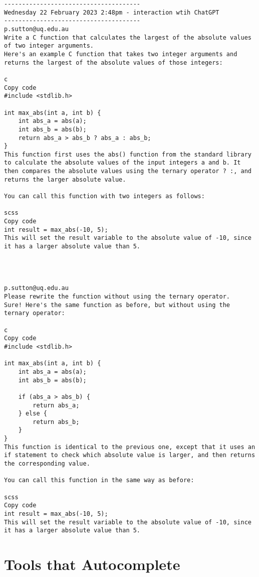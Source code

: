 \documentclass{article}
\begin{document}
\nolinenumbers
{}
\begin{lstlisting}
--------------------------------------
Wednesday 22 February 2023 2:48pm - interaction wtih ChatGPT
--------------------------------------
p.sutton@uq.edu.au
Write a C function that calculates the largest of the absolute values of two integer arguments.
Here's an example C function that takes two integer arguments and returns the largest of the absolute values of those integers:

c
Copy code
#include <stdlib.h>

int max_abs(int a, int b) {
    int abs_a = abs(a);
    int abs_b = abs(b);
    return abs_a > abs_b ? abs_a : abs_b;
}
This function first uses the abs() function from the standard library to calculate the absolute values of the input integers a and b. It then compares the absolute values using the ternary operator ? :, and returns the larger absolute value.

You can call this function with two integers as follows:

scss
Copy code
int result = max_abs(-10, 5);
This will set the result variable to the absolute value of -10, since it has a larger absolute value than 5.




p.sutton@uq.edu.au
Please rewrite the function without using the ternary operator.
Sure! Here's the same function as before, but without using the ternary operator:

c
Copy code
#include <stdlib.h>

int max_abs(int a, int b) {
    int abs_a = abs(a);
    int abs_b = abs(b);
    
    if (abs_a > abs_b) {
        return abs_a;
    } else {
        return abs_b;
    }
}
This function is identical to the previous one, except that it uses an if statement to check which absolute value is larger, and then returns the corresponding value.

You can call this function in the same way as before:

scss
Copy code
int result = max_abs(-10, 5);
This will set the result variable to the absolute value of -10, since it has a larger absolute value than 5.
\end{lstlisting}
\linenumbers

\section{Tools that Autocomplete}
\end{document}
